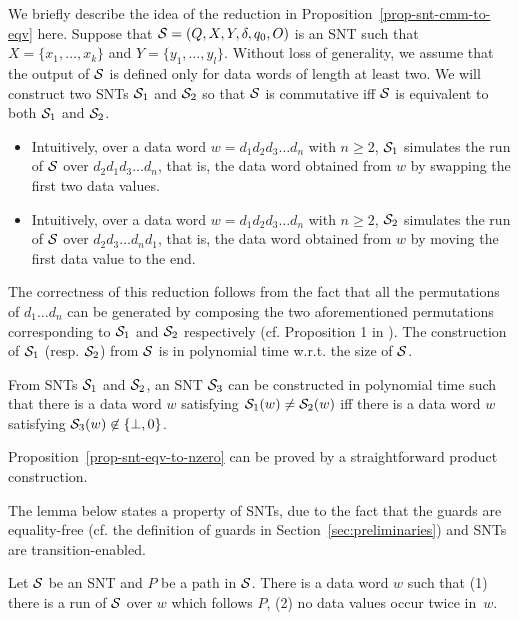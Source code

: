 We briefly describe the idea of the reduction in Proposition~\ref{prop-snt-cmm-to-eqv} here. Suppose that ${\mathcal{S} }=(Q, X, Y, \delta, q_0, O)$ is an SNT such that $X=\{x_1,\dots,x_k\}$ and $Y=\{y_1,\dots,y_l\}$. Without loss of generality, we assume that the output of ${\mathcal{S} }$ is defined only for data words of length at least two. We will construct two SNTs ${\mathcal{S} }_1$ and ${\mathcal{S} }_2$ so that ${\mathcal{S} }$ is commutative iff ${\mathcal{S} }$ is equivalent to both ${\mathcal{S} }_1$ and ${\mathcal{S} }_2$.
\begin{itemize}
\item Intuitively, over a data word $w=d_1 d_2 d_3 \dots d_n$ with $n\ge 2$, ${\mathcal{S} }_1$ simulates the run of ${\mathcal{S} }$ over $d_2 d_1 d_3 \dots d_n$, that is, the data word obtained from $w$ by swapping the first two data values.
%
\item Intuitively, over a data word $w=d_1 d_2 d_3 \dots d_n$ with $n\ge 2$, ${\mathcal{S} }_2$ simulates the run of ${\mathcal{S} }$ over $d_2 d_3 \dots d_n d_1$, that is, the data word obtained from $w$ by moving the first data value to the end. 
\end{itemize}
The correctness of this reduction follows from the fact that all the permutations of $d_1\dots d_n$ can be generated by composing the two aforementioned permutations corresponding to ${\mathcal{S} }_1$ and ${\mathcal{S} }_2$ respectively (cf. Proposition 1 in \cite{CHSW15}). The construction of ${\mathcal{S} }_1$ (resp. ${\mathcal{S} }_2$) from ${\mathcal{S} }$ is in  polynomial time w.r.t. the size of ${\mathcal{S} }$.

\begin{proposition}\label{prop-snt-eqv-to-nzero}
From SNTs ${\mathcal{S} }_1$ and ${\mathcal{S} }_2$, an SNT ${\mathcal{S} }_3$ can be constructed in polynomial time such that there is a data word $w$ satisfying ${\mathcal{S} }_1(w) \neq {\mathcal{S} }_2(w)$ iff there is a data word $w$ satisfying ${\mathcal{S} }_3(w) \not\in \{\bot,0\}$. 
\end{proposition}
Proposition~\ref{prop-snt-eqv-to-nzero} can be proved by a straightforward product construction.

The lemma below states a property of SNTs, due to the fact that the guards are equality-free (cf. the definition of guards in Section~\ref{sec:preliminaries}) and SNTs are transition-enabled.

\begin{proposition}\label{prop-snt-distinct-value}
Let ${\mathcal{S} }$ be an SNT and $P$ be a path in ${\mathcal{S} }$. There is a data word $w$ such that (1) there is a run of ${\mathcal{S} }$ over $w$ which follows $P$, (2) no data values occur twice in~$w$.
\end{proposition}



